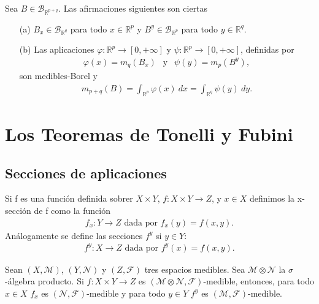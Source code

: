 \begin{cor}
Sea $B \in \mathcal{B}_{\mathbb{R}^{p+q}}$. Las afirmaciones siguientes son ciertas
\begin{enumerate}
    \item[(a)] $B_x \in \mathcal{B}_{\mathbb{R}^{q}}$ para todo $x \in \mathbb{R}^{p}$ y $B^y \in \mathcal{B}_{\mathbb{R}^{p}}$ para todo $y \in \mathbb{R}^{q}$.
    \item[(b)] Las aplicaciones $\varphi: \mathbb{R}^p \longrightarrow [0,+\infty]$ y $\psi: \mathbb{R}^p \longrightarrow [0,+\infty]$, definidas por
    \begin{align*}
        \varphi(x) = m_q(B_x) \ \ \text{ y } \ \ \psi(y) = m_p(B^y),
    \end{align*}
    son medibles-Borel y 
    \begin{align*}
        m_{p+q}(B) = \int_{\mathbb{R}^p}{\varphi(x) \ dx} = \int_{\mathbb{R}^q}{\psi(y) \ dy}.
    \end{align*}
\end{enumerate}
\end{cor}

\section{Los Teoremas de Tonelli y Fubini}

\subsection{Secciones de aplicaciones}

\begin{defi}
Si f es una función definida sobrer $X \times Y$, $f: X \times Y \longrightarrow Z$, y $x \in X$ definimos la x-sección de f como la función
\begin{align*}
    f_x : Y \longrightarrow Z \text{ dada por } f_x(y) = f(x,y).
\end{align*}
Análogamente se define las secciones $f^y$ si $y \in Y$:
\begin{align*}
    f^y : X \longrightarrow Z \text{ dada por } f^y(x) = f(x,y).
\end{align*}
\end{defi}

\begin{prop}
Sean $(X, \mathcal{M})$, $(Y, \mathcal{N})$ y $(Z, \mathcal{F})$ tres espacios medibles. Sea $\mathcal{M} \otimes \mathcal{N}$ la $\sigma$-álgebra producto. Si $f: X \times Y \longrightarrow Z$ es $(\mathcal{M} \otimes \mathcal{N}, \mathcal{F})$-medible, entonces, para todo $x \in X$ $f_x$ es $(\mathcal{N}, \mathcal{F})$-medible y para todo $y \in Y$ $f^y$ es $(\mathcal{M}, \mathcal{F})$-medible.
\end{prop}

